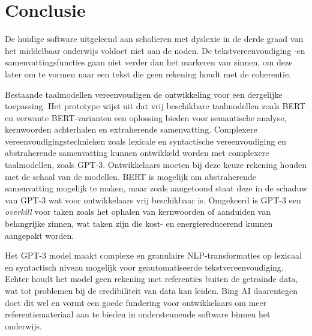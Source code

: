 
\chapter{Conclusie}%
\label{ch:conclusie}









De huidige software uitgeleend aan scholieren met dyslexie in de derde graad van het middelbaar onderwijs voldoet niet aan de noden. De tekstvereenvoudiging -en samenvattingsfuncties gaan niet verder dan het markeren van zinnen, om deze later om te vormen naar een tekst die geen rekening houdt met de coherentie.


Bestaande taalmodellen vereenvoudigen de ontwikkeling voor een dergelijke toepassing. Het prototype wijst uit dat vrij beschikbare taalmodellen zoals BERT en verwante BERT-varianten een oplossing bieden voor semantische analyse, kernwoorden achterhalen en extraherende samenvatting. Complexere vereenvoudigingstechnieken zoals lexicale en syntactische vereenvoudiging en abstraherende samenvatting kunnen ontwikkeld worden met complexere taalmodellen, zoals GPT-3. Ontwikkelaars moeten bij deze keuze rekening houden met de schaal van de modellen. BERT is mogelijk om abstraherende samenvatting mogelijk te maken, maar zoals aangetoond staat deze in de schaduw van GPT-3 wat voor ontwikkelaars vrij beschikbaar is. Omgekeerd is GPT-3 een \textit{overkill} voor taken zoals het ophalen van kernwoorden of aanduiden van belangrijke zinnen, wat taken zijn die kost- en energiereducerend kunnen aangepakt worden.

Het GPT-3 model maakt complexe en granulaire NLP-transformaties op lexicaal en syntactisch niveau mogelijk voor geautomatiseerde tekstvereenvoudiging. Echter houdt het model geen rekening met referenties buiten de getrainde data, wat tot problemen bij de credibiliteit van data kan leiden. Bing AI daarentegen doet dit wel en vormt een goede fundering voor ontwikkelaars om meer referentiemateriaal aan te bieden in ondersteunende software binnen het onderwijs.

